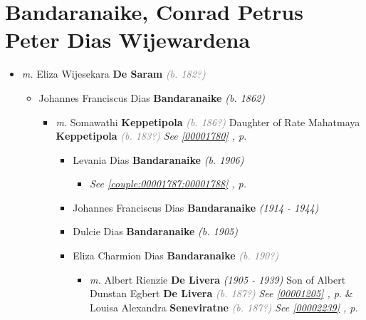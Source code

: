 \documentclass[10pt, openany]{book}
\begin{document}
\chapter{Bandaranaike, Conrad Petrus Peter Dias Wijewardena}
\label{00001749}
\textcolor{slmaroon}{\textit{}}
\begin{itemize}
\item{\textit{m.} Eliza Wijesekara \textbf{De Saram} \textcolor{gray}{\textit{(b. 182?)}}   \label{couple:00001749:00001750} \begin{itemize}
\item{Johannes Franciscus Dias \textbf{Bandaranaike} \textcolor{slorange}{\textit{(b. 1862)}}
\begin{itemize}
\item{\textit{m.} Somawathi \textbf{Keppetipola} \textcolor{gray}{\textit{(b. 186?)}} Daughter of  Rate Mahatmaya \textbf{Keppetipola} \textcolor{gray}{\textit{(b. 183?)}} \textcolor{slteal}{\textit{See  \autoref{00001780} \textit{, p. \pageref{00001780} }}}   \label{couple:00001778:00001779} \begin{itemize}
\item{Levania Dias \textbf{Bandaranaike} \textcolor{slorange}{\textit{(b. 1906)}}
\begin{itemize}
\item{\textcolor{slteal}{\textit{See  \autoref{couple:00001787:00001788} \textit{, p. \pageref{couple:00001787:00001788} }}}}
\end{itemize}
  }
\item{Johannes Franciscus Dias \textbf{Bandaranaike} \textcolor{slorange}{\textit{(1914 - 1944)}}
   }
\item{Dulcie Dias \textbf{Bandaranaike} \textcolor{slorange}{\textit{(b. 1905)}}
  }
\item{Eliza Charmion Dias \textbf{Bandaranaike} \textcolor{gray}{\textit{(b. 190?)}}
\begin{itemize}
\item{\textit{m.} Albert Rienzie \textbf{De Livera} \textcolor{slorange}{\textit{(1905 - 1939)}} Son of  Albert Dunstan Egbert \textbf{De Livera} \textcolor{gray}{\textit{(b. 187?)}} \textcolor{slteal}{\textit{See  \autoref{00001205} \textit{, p. \pageref{00001205} }}}  \&  Louisa Alexandra \textbf{Seneviratne} \textcolor{gray}{\textit{(b. 187?)}} \textcolor{slteal}{\textit{See  \autoref{00002239} \textit{, p. \pageref{00002239} }}}   \label{couple:00001789:00001790} \begin{itemize}

\end{itemize}}
\end{itemize}}
\end{itemize}}
\end{itemize}}
\end{itemize}}
\end{itemize}
\end{document}
